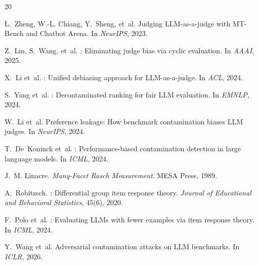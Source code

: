 \documentclass[11pt,a4paper]{article}
\begin{document}
\begin{thebibliography}{20}

L.~Zheng, W.-L. Chiang, Y.~Sheng, et~al.
\newblock Judging {LLM}-as-a-judge with {MT-Bench} and {Chatbot Arena}.
\newblock In \emph{NeurIPS}, 2023.

Z.~Lin, S.~Wang, et~al.
: Eliminating judge bias via cyclic evaluation.
\newblock In \emph{AAAI}, 2025.

X.~Li et~al.
: Unified debiasing approach for {LLM}-as-a-judge.
\newblock In \emph{ACL}, 2024.

S.~Yang et~al.
: Decontaminated ranking for fair {LLM} evaluation.
\newblock In \emph{EMNLP}, 2024.

W.~Li et~al.
\newblock Preference leakage: How benchmark contamination biases {LLM} judges.
\newblock In \emph{NeurIPS}, 2024.

T.~De~Koninck et~al.
: Performance-based contamination detection in large language models.
\newblock In \emph{ICML}, 2024.

J.~M. Linacre.
\newblock \emph{Many-Facet {Rasch} Measurement}.
\newblock MESA Press, 1989.

A.~Robitzsch.
: Differential group item response theory.
\newblock \emph{Journal of Educational and Behavioral Statistics}, 45(6), 2020.

F.~Polo et~al.
: Evaluating {LLMs} with fewer examples via item response theory.
\newblock In \emph{ICML}, 2024.

Y.~Wang et~al.
\newblock Adversarial contamination attacks on {LLM} benchmarks.
\newblock In \emph{ICLR}, 2026.

\end{thebibliography}
\end{document}
